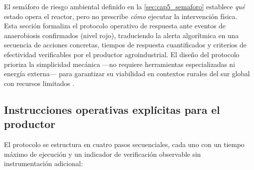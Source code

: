 El semáforo de riesgo ambiental definido en la \cref{sec:cap5_semaforo} establece \textit{qué} estado opera el reactor, pero no prescribe \textit{cómo} ejecutar la intervención física. Esta sección formaliza el protocolo operativo de respuesta ante eventos de anaerobiosis confirmados (nivel rojo), traduciendo la alerta algorítmica en una secuencia de acciones concretas, tiempos de respuesta cuantificados y criterios de efectividad verificables por el productor agroindustrial. El diseño del protocolo prioriza la simplicidad mecánica —no requiere herramientas especializadas ni energía externa— para garantizar su viabilidad en contextos rurales del sur global con recursos limitados \parencite{fawzyStrategiesMitigationClimate2020}.

\subsection{Instrucciones operativas explícitas para el productor}
\label{subsec:cap5_instrucciones}

El protocolo se estructura en cuatro pasos secuenciales, cada uno con un tiempo máximo de ejecución y un indicador de verificación observable sin instrumentación adicional:

